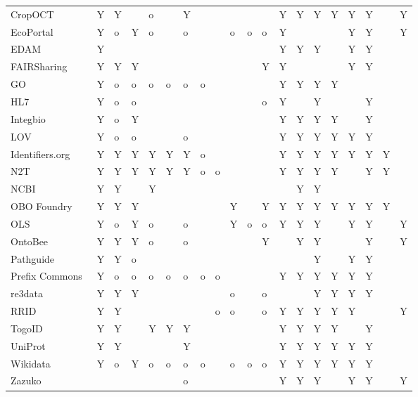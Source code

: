 \begin{table}
\begin{tabular}{llllllllllllllllllll}
CropOCT~\cite{Arnaud2020} & Y & Y &  & o &  & Y &  &  &  &  &  & Y & Y & Y & Y & Y & Y &  & Y \\
EcoPortal~\cite{Kechagioglou2021} & Y & o & Y & o &  & o &  &  & o & o & o & Y &  &  &  & Y & Y &  & Y \\
EDAM~\cite{Ison2013} & Y &  &  &  &  &  &  &  &  &  &  & Y & Y & Y &  & Y & Y &  &  \\
FAIRSharing~\cite{Sansone2019} & Y & Y & Y &  &  &  &  &  &  &  & Y & Y &  &  &  & Y & Y &  &  \\
GO~\cite{TheGeneOntologyConsortium2019} & Y & o & o & o & o & o & o &  &  &  &  & Y & Y & Y & Y &  &  &  &  \\
HL7~\cite{Bender2013} & Y & o & o &  &  &  &  &  &  &  & o & Y &  & Y &  &  & Y &  &  \\
Integbio & Y & o & Y &  &  &  &  &  &  &  &  & Y & Y & Y & Y &  & Y &  &  \\
LOV & Y & o & o &  &  & o &  &  &  &  &  & Y & Y & Y & Y & Y & Y &  &  \\
Identifiers.org~\cite{Juty2012} & Y & Y & Y & Y & Y & Y & o &  &  &  &  & Y & Y & Y & Y & Y & Y & Y &  \\
N2T~\cite{Wimalaratne2018} & Y & Y & Y & Y & Y & Y & o & o &  &  &  & Y & Y & Y & Y &  & Y & Y &  \\
NCBI~\cite{Clark2016} & Y & Y &  & Y &  &  &  &  &  &  &  &  & Y & Y &  &  &  &  &  \\
OBO Foundry~\cite{Jackson2021} & Y & Y & Y &  &  &  &  &  & Y &  & Y & Y & Y & Y & Y & Y & Y & Y &  \\
OLS~\cite{Cote2006a} & Y & o & Y & o &  & o &  &  & Y & o & o & Y & Y & Y &  & Y & Y &  & Y \\
OntoBee~\cite{Ong2017} & Y & Y & Y & o &  & o &  &  &  &  & Y &  & Y & Y &  &  & Y &  & Y \\
Pathguide & Y & Y & o &  &  &  &  &  &  &  &  &  &  & Y &  & Y & Y &  &  \\
Prefix Commons~\cite{prefixcommons} & Y & o & o & o & o & o & o & o &  &  &  & Y & Y & Y & Y & Y & Y &  &  \\
re3data~\cite{Pampel2013} & Y & Y & Y &  &  &  &  &  & o &  & o &  &  & Y & Y & Y & Y &  &  \\
RRID & Y & Y &  &  &  &  &  & o & o &  & o & Y & Y & Y & Y & Y &  &  & Y \\
TogoID & Y & Y &  & Y & Y & Y &  &  &  &  &  & Y & Y & Y & Y &  & Y &  &  \\
UniProt~\cite{Bateman2021} & Y & Y &  &  &  & Y &  &  &  &  &  & Y & Y & Y & Y & Y & Y &  &  \\
Wikidata~\cite{Waagmeester2020} & Y & o & Y & o & o & o & o &  & o & o & o & Y & Y & Y & Y & Y & Y &  &  \\
Zazuko &  &  &  &  &  & o &  &  &  &  &  & Y & Y & Y &  & Y & Y &  & Y \\
\bottomrule
\end{tabular}
\end{table}
